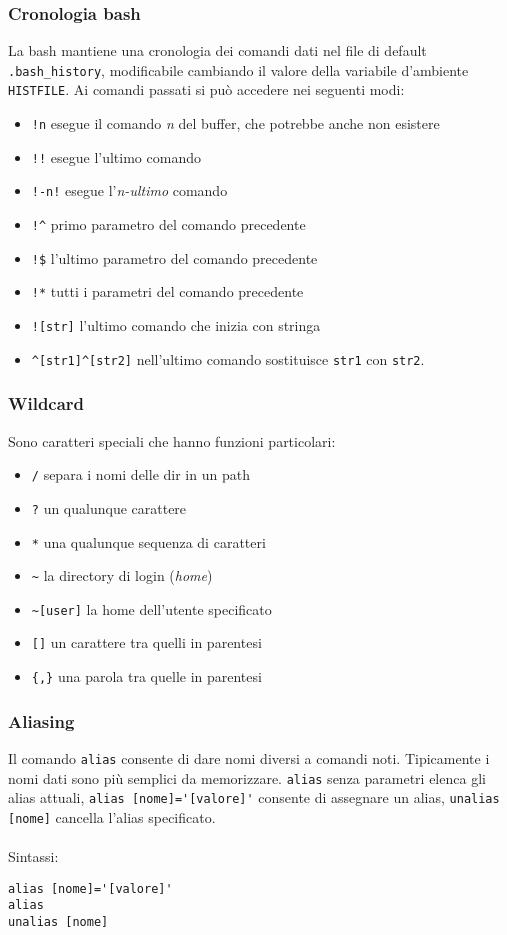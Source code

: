 \documentclass[a4paper, 10pt]{article}
\begin{document}
\subsubsection{Cronologia bash} La bash mantiene una cronologia dei comandi dati nel file di default \verb|.bash_history|, modificabile cambiando il valore della variabile d'ambiente \verb|HISTFILE|.
Ai comandi passati si può accedere nei seguenti modi:
\begin{itemize}
\item \verb|!n| esegue il comando \textit{n} del buffer, che potrebbe anche non esistere
\item \verb|!!| esegue l'ultimo comando
\item \verb|!-n!| esegue l'\textit{n-ultimo} comando
\item \verb|!^| primo parametro del comando precedente
\item \verb|!$| l'ultimo parametro del comando precedente
\item \verb|!*| tutti i parametri del comando precedente
\item \verb|![str]| l'ultimo comando che inizia con stringa
\item \verb|^[str1]^[str2]| nell'ultimo comando sostituisce \verb|str1| con \verb|str2|.
\end{itemize}

\subsubsection{Wildcard} Sono caratteri speciali che hanno funzioni particolari:
\begin{itemize}
\item \verb|/| separa i nomi delle dir in un path
\item \verb|?| un qualunque carattere
\item \verb|*| una qualunque sequenza di caratteri
\item \verb|~| la directory di login (\textit{home})
\item \verb|~[user]| la home dell'utente specificato
\item \verb|[]| un carattere tra quelli in parentesi
\item \verb|{,}| una parola tra quelle in parentesi
\end{itemize}

\subsubsection{Aliasing} Il comando \verb|alias| consente di dare nomi diversi a comandi noti. Tipicamente i nomi dati sono più semplici da memorizzare. \verb|alias| senza parametri elenca gli alias attuali, \verb|alias [nome]='[valore]'| consente di assegnare un alias, \verb|unalias [nome]| cancella l'alias specificato.\\ \\
Sintassi:
\begin{verbatim}
alias [nome]='[valore]'
alias
unalias [nome]
\end{verbatim}
\end{document}
